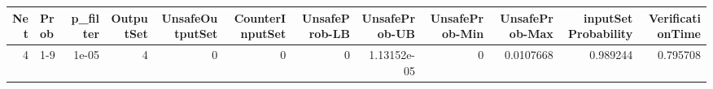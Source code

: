 \begin{tabular}{rlrrrrrrrrrr}
\hline
   Net & Prob   &   p\_filter &   OutputSet &   UnsafeOutputSet &   CounterInputSet &   UnsafeProb-LB &   UnsafeProb-UB &   UnsafeProb-Min &   UnsafeProb-Max &   inputSet Probability &   VerificationTime \\
\hline
     4 & 1-9    &      1e-05 &           4 &                 0 &                 0 &               0 &     1.13152e-05 &                0 &        0.0107668 &               0.989244 &           0.795708 \\
\hline
\end{tabular}
